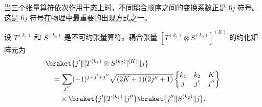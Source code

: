 当三个张量算符依次作用于态上时，不同耦合顺序之间的变换系数正是 $6j$ 符号。这是 $6j$ 符号在物理中最重要的出现方式之一。
\begin{theorem}[三个张量算符的约化矩阵元公式]
设 $T^{(k_1)}$ 和 $S^{(k_2)}$ 是不可约张量算符。耦合张量 $[T^{(k_1)}\otimes S^{(k_2)}]^{(K)}$ 的约化矩阵元为
\begin{equation}
\begin{aligned}
&\braket{j'\|[T^{(k_1)}\otimes S^{(k_2)}]^{(K)}\|j}\\
&\quad=\sum_{j''}(-1)^{j+j'+j''}
\sqrt{(2K+1)(2j''+1)}
\begin{Bmatrix}k_1&k_2&K\\j&j'&j''\end{Bmatrix}\\
&\qquad\times
\braket{j'\|T^{(k_1)}\|j''}
\braket{j''\|S^{(k_2)}\|j}.
\end{aligned}
\label{eq:reduced-me-product}
\end{equation}
\end{theorem}
